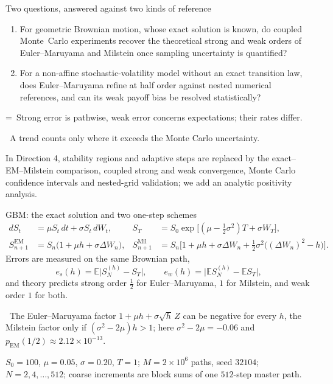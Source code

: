 \documentclass[aspectratio=169,10pt,t]{beamer}
\newcommand{\E}{\mathbb{E}}
\begin{document}
\begin{frame}{Two questions, answered against two kinds of reference}
\bodytop
\begin{enumerate}\setlength{\itemsep}{0.8em}
\item For geometric Brownian motion, whose exact solution is known, do coupled Monte~Carlo experiments recover the
  theoretical strong and weak orders of Euler--Maruyama and Milstein once sampling uncertainty is quantified?
\item For a non-affine stochastic-volatility model without an exact transition law, does Euler--Maruyama refine at half order
  against nested numerical references, and can its weak payoff bias be resolved statistically?
\end{enumerate}
\vspace{0.95em}
{\leftskip=\leftmargini{}\ Strong error is pathwise, weak error concerns expectations; their rates differ.\par}%
\vspace{0.6em}
\hspace*{\leftmargini}\ A trend counts only where it exceeds the Monte Carlo uncertainty.
\closing{In Direction 4, stability regions and adaptive steps are replaced by the exact--EM--Milstein comparison, coupled strong and
weak convergence, Monte Carlo confidence intervals and nested-grid validation; we add an analytic positivity analysis.}
\end{frame}

\begin{frame}{GBM: the exact solution and two one-step schemes}
\bodytop\vspace{1.0mm}\vspace{-\abovedisplayskip}\vspace{-\baselineskip}
\begin{align*}
dS_t&=\mu S_t\,dt+\sigma S_t\,dW_t, & S_T&=S_0\exp\bigl[(\mu-\tfrac12\sigma^2)T+\sigma W_T\bigr],\\[0.2em]
S^{\mathrm{EM}}_{n+1}&=S_n\bigl(1+\mu h+\sigma\Delta W_n\bigr), &
S^{\mathrm{Mil}}_{n+1}&=S_n\bigl[1+\mu h+\sigma\Delta W_n+\tfrac12\sigma^2\bigl((\Delta W_n)^2-h\bigr)\bigr].
\end{align*}
Errors are measured on the same Brownian path,
\[
e_s(h)=\E\bigl|S^{(h)}_N-S_T\bigr|,\qquad e_w(h)=\bigl|\E S^{(h)}_N-\E S_T\bigr|,
\]
and theory predicts strong order $\tfrac12$ for Euler--Maruyama, $1$ for Milstein, and weak order $1$ for both.
\par\vspace{0.75em}%
\ The Euler--Maruyama factor $1+\mu h+\sigma\sqrt h\,Z$ can be negative for every $h$, the Milstein
factor only if $(\sigma^2-2\mu)h>1$; here $\sigma^2-2\mu=-0.06$ and $p_{\mathrm{EM}}(1/2)\approx2.12\times10^{-13}$.
\closing{$S_0=100$, $\mu=0.05$, $\sigma=0.20$, $T=1$; $M=2\times10^6$ paths, seed $32104$; $N=2,4,\dots,512$; coarse
increments are block sums of one $512$-step master path.}
\end{frame}
\end{document}
